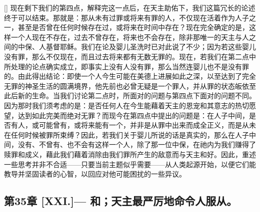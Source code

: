 [] 现在剩下我们的第四点，解释完这一点后，在天主助佑下，我们这篇冗长的论述终于可以结束。那就是：那从未有过罪或将来有罪的人，不仅现在活着作为人子之一，甚至是否曾在任何时候存在过，或将来在时间中存在？现在完全确定的是，这样一个人现在不存在，过去不曾存在，将来也不会存在，除非那唯一的天主与人之间的中保、人基督耶稣。我们在论及婴儿圣洗时已对此说了不少；因为若这些婴儿没有罪，那么不仅现在，而且过去将来都有无数无罪的。现在，若我们在第二点中所处理的论点确实成立，即事实上没有人没有罪，那么当然连婴儿也不是没有罪的。由此得出结论：即使一个人今生可能在美德上进展如此之深，以至达到了完全无罪的神圣生活的圆满境界，他先前也必曾无疑是一个罪人，并从罪的状态皈依至此后新的生命。当我们讨论第二点时，所面对的问题与第四点下面对的问题不同。因为那时我们须考虑的是：是否任何人在今生能藉着天主的恩宠和其意志的热切愿望，达到如此完美而绝对无罪？而现今在第四点中提出的问题是：在人子中间，是否有人，或可能曾有，或将来能有一个，并非是从罪中出来而成全正义，而是从未在任何时候被罪所束缚？因此，若我们关于婴儿所说的话是真实的，那么在人子中间，没有、不曾有、也不会有这样一个人，除了那一位中保，在祂内为我们赚得了赎罪和成义，藉此我们藉着消除由我们罪所产生的敌意而与天主和好。因此，重述一些思考并非不合适——只要当前主题似乎需要——从人类起源开始，以便它们能教导并坚固读者的心智，以回应对他可能困扰的一些异议。\par


\subsection{第35章 [XXI.]— 和；天主最严厉地命令人服从。}

